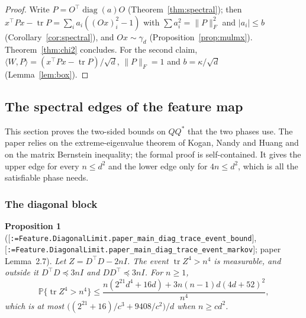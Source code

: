 \documentclass[11pt]{article}
\makeatletter
\newcommand{\formal@break}[1]{\@tfor\formal@tok:=#1\do{%
  \formal@tok
  \expandafter\ifx\formal@tok.\allowbreak\else
  \expandafter\ifx\formal@tok\_\allowbreak\fi\fi}}
\DeclareRobustCommand{\formal}[1]{\textnormal{[\texttt{\small\formal@break{#1}}]}}
\newcommand{\Prob}{\mathbb{P}}
\newcommand{\ip}[2]{\langle #1, #2\rangle}
\newcommand{\norm}[1]{\lVert #1\rVert}
\newcommand{\abs}[1]{\lvert #1\rvert}
\newcommand{\tr}{\operatorname{tr}}
\newcommand{\Fro}{F}
\newcommand{\sqd}{\sqrt{d}}
\newcommand{\Id}{I}
\newcommand{\gauss}{\gamma}
\newcommand{\diag}{\operatorname{diag}}
\theoremstyle{plain}
\newtheorem{proposition}[theorem]{Proposition}
\theoremstyle{definition}
\makeatother
\begin{document}
\begin{proof}
Write $P = O^{\top}\diag(a)O$ (Theorem~\ref{thm:spectral}); then
$x^{\top}Px - \tr P = \sum_i a_i((Ox)_i^2 - 1)$ with $\sum a_i^2 = \norm{P}_\Fro^2$
and $\abs{a_i} \le b$ (Corollary~\ref{cor:spectral}), and $Ox \sim \gauss_d$
(Proposition~\ref{prop:mulmx}). Theorem~\ref{thm:chi2} concludes. For the
second claim, $\ip{W}{P} = (x^{\top}Px - \tr P)/\sqd$, $\norm{P}_\Fro = 1$ and
$b = \kappa/\sqd$ (Lemma~\ref{lem:box}).
\end{proof}

\subsection{The spectral edges of the feature map}\label{sec:edge}

This section proves the two-sided bounds on $QQ^{*}$ that the two phases
use. The paper relies on the extreme-eigenvalue theorem of Kogan, Nandy and
Huang and on the matrix Bernstein inequality; the formal proof is
self-contained. It gives the upper edge for every $n \le d^2$ and the lower
edge only for $4n \le d^2$, which is all the satisfiable phase needs.

\subsubsection{The diagonal block}

\begin{proposition}[\formal{Feature.DiagonalLimit.paper\_main\_diag\_trace\_event\_bound}, \formal{Feature.DiagonalLimit.paper\_main\_diag\_trace\_event\_markov}; paper Lemma~2.7]\label{prop:diag}
Let $Z = D^{\top}D - 2n\Id$. The event $\tr Z^4 > n^4$ is measurable, and
outside it $D^{\top}D \preceq 3n\Id$ and $DD^{\top} \preceq 3n\Id$. For $n \ge 1$,
\[
\Prob\{\tr Z^4 > n^4\} \le \frac{n(2^{21}d^4 + 16d) + 3n(n-1)d(4d + 52)^2}{n^4},
\]
which is at most $\bigl((2^{21} + 16)/c^3 + 9408/c^2\bigr)/d$ when $n \ge cd^2$.
\end{proposition}
\end{document}
